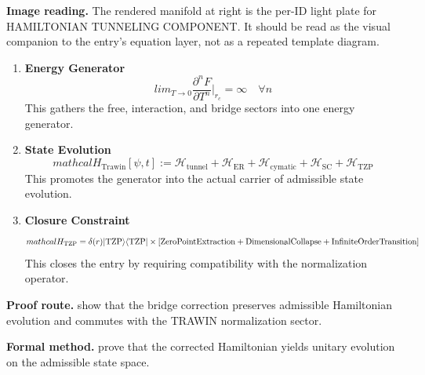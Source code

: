 \begin{samepage}
\noindent\begin{minipage}[t]{0.45\linewidth}
\vspace{0pt}
\raggedright
\scriptsize\textbf{Image reading.} The rendered manifold at right is the per-ID light plate for HAMILTONIAN TUNNELING COMPONENT. It should be read as the visual companion to the entry's equation layer, not as a repeated template diagram.\par
\end{minipage}\hfill
\begin{minipage}[t]{0.53\linewidth}
\vspace*{-0.10in}
\raggedright
{}
\end{minipage}
\end{samepage}

\clearpage


\begin{enumerate}[leftmargin=1.6em,itemsep=9pt,topsep=6pt]
\item \textbf{Energy Generator}
\[
lim_{T \to 0} \frac{\partial^n F}{\partial T^n}\bigg|_{r_c} = \infty \quad \forall n
\]
This gathers the free, interaction, and bridge sectors into one energy generator.

\item \textbf{State Evolution}
\[
mathcal{H}_{\text{Trawin}}[\psi, t] := \mathcal{H}_{\text{tunnel}} + \mathcal{H}_{\text{ER}} + \mathcal{H}_{\text{cymatic}} + \mathcal{H}_{\text{SC}} + \mathcal{H}_{\text{TZP}}
\]
This promotes the generator into the actual carrier of admissible state evolution.

\item \textbf{Closure Constraint}
\[
mathcal{H}_{\text{TZP}} = \delta(r)|{\rm TZP}\rangle\langle{\rm TZP}| \times \left[\text{ZeroPointExtraction} + \text{DimensionalCollapse} + \text{InfiniteOrderTransition}\right]
\]
This closes the entry by requiring compatibility with the normalization operator.
\end{enumerate}

\textbf{Proof route.} show that the bridge correction preserves admissible Hamiltonian evolution and commutes with the TRAWIN normalization sector.

\textbf{Formal method.} prove that the corrected Hamiltonian yields unitary evolution on the admissible state space.

